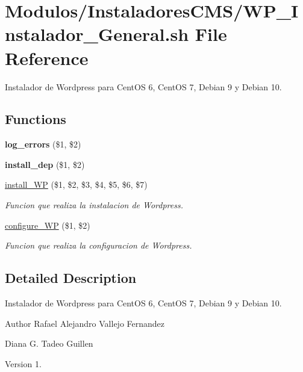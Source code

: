 \hypertarget{WP__Instalador__General_8sh}{}\section{Modulos/\+Instaladores\+C\+M\+S/\+W\+P\+\_\+\+Instalador\+\_\+\+General.sh File Reference}
\label{WP__Instalador__General_8sh}


Instalador de Wordpress para Cent\+OS 6, Cent\+OS 7, Debian 9 y Debian 10.  


\subsection*{Functions}
\begin{DoxyCompactItemize}
\item 
\mbox{\label{WP__Instalador__General_8sh_a92067b58a8478c9841b2cd9b75ea3565}} 
{\bfseries log\+\_\+errors} (\$1, \$2)
\item 
\mbox{\label{WP__Instalador__General_8sh_a7aff02becf631a8cd3f06f1fc2688670}} 
{\bfseries install\+\_\+dep} (\$1, \$2)
\item 
\hyperlink{WP__Instalador__General_8sh_ab8bd4095cd5a5c54fa9256d3064f6d0f}{install\+\_\+\+WP} (\$1, \$2, \$3, \$4, \$5, \$6, \$7)
\begin{DoxyCompactList}\small\item\em Funcion que realiza la instalacion de Wordpress. \end{DoxyCompactList}\item 
\hyperlink{WP__Instalador__General_8sh_add91f549a7f408a6c51455ab9982ef5e}{configure\+\_\+\+WP} (\$1, \$2)
\begin{DoxyCompactList}\small\item\em Funcion que realiza la configuracion de Wordpress. \end{DoxyCompactList}\end{DoxyCompactItemize}


\subsection{Detailed Description}
Instalador de Wordpress para Cent\+OS 6, Cent\+OS 7, Debian 9 y Debian 10. 

\begin{DoxyAuthor}{Author}
Rafael Alejandro Vallejo Fernandez 

Diana G. Tadeo Guillen 
\end{DoxyAuthor}
\begin{DoxyVersion}{Version}
1. 
\end{DoxyVersion}



